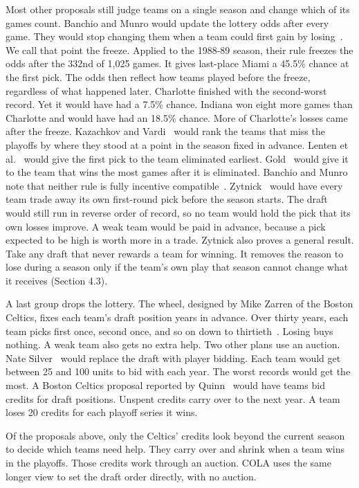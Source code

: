 \documentclass[11pt,letterpaper]{article}
\begin{document}
Most other proposals still judge teams on a single season and change which of its games count. Banchio and Munro would update the lottery odds after every game. They would stop changing them when a team could first gain by losing~\cite{munro2020notanking}. We call that point the freeze. Applied to the 1988-89 season, their rule freezes the odds after the 332nd of 1,025 games. It gives last-place Miami a 45.5\% chance at the first pick. The odds then reflect how teams played before the freeze, regardless of what happened later. Charlotte finished with the second-worst record. Yet it would have had a 7.5\% chance. Indiana won eight more games than Charlotte and would have had an 18.5\% chance. More of Charlotte's losses came after the freeze. Kazachkov and Vardi~\cite{kazachkov2020tanking} would rank the teams that miss the playoffs by where they stood at a point in the season fixed in advance. Lenten et al.~\cite{lenten2018evaluating} would give the first pick to the team eliminated earliest. Gold~\cite{gold2010nhl} would give it to the team that wins the most games after it is eliminated. Banchio and Munro note that neither rule is fully incentive compatible~\cite{munro2020notanking}. Zytnick~\cite{zytnick2026trade} would have every team trade away its own first-round pick before the season starts. The draft would still run in reverse order of record, so no team would hold the pick that its own losses improve. A weak team would be paid in advance, because a pick expected to be high is worth more in a trade. Zytnick also proves a general result. Take any draft that never rewards a team for winning. It removes the reason to lose during a season only if the team's own play that season cannot change what it receives (Section 4.3).

A last group drops the lottery. The wheel, designed by Mike Zarren of the Boston Celtics, fixes each team's draft position years in advance. Over thirty years, each team picks first once, second once, and so on down to thirtieth~\cite{lowe2013wheel,lowe2014wheel}. Losing buys nothing. A weak team also gets no extra help. Two other plans use an auction. Nate Silver~\cite{silver2026arc} would replace the draft with player bidding. Each team would get between 25 and 100 units to bid with each year. The worst records would get the most. A Boston Celtics proposal reported by Quinn~\cite{quinn2026credits} would have teams bid credits for draft positions. Unspent credits carry over to the next year. A team loses 20 credits for each playoff series it wins.

Of the proposals above, only the Celtics' credits look beyond the current season to decide which teams need help. They carry over and shrink when a team wins in the playoffs. Those credits work through an auction. COLA uses the same longer view to set the draft order directly, with no auction.
\end{document}
